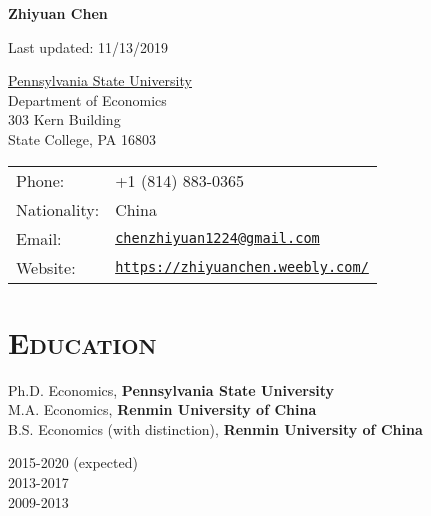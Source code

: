 \documentclass[letterpaper]{article}
\def\name{Zhiyuan Chen}
\begin{document}

\centerline{\huge \bf \name}

\vspace{1ex}

\normalsize


\begin{center}
{\scriptsize Last updated: 11/13/2019}
\end{center}

\vspace{0.25in}

\begin{minipage}{0.5\linewidth}
  \href{http://www.econ.psu.edu/}{Pennsylvania State University} \\
  Department of Economics \\
  303 Kern Building \\
  State College, PA 16803
\end{minipage}
\begin{minipage}{0.5\linewidth}
  \begin{tabular}{ll}
    Phone: & +1 (814) 883-0365 \\
    Nationality: &  China \\
    Email: & \href{mailto:chenzhiyuan1224@gmail.com}{\tt chenzhiyuan1224@gmail.com} \\
    Website: & \href{https://zhiyuanchen.weebly.com/}{\tt https://zhiyuanchen.weebly.com/} \\
  \end{tabular}
\end{minipage}




\section*{\textsc{Education}}
\begin{minipage}{0.7\textwidth}
 Ph.D. Economics, \textbf{Pennsylvania State University}\\
  M.A.  Economics, \textbf{Renmin University of China}  \\
 B.S.  Economics (with distinction), \textbf{Renmin University of China}
\end{minipage}
\begin{minipage}{0.3\textwidth}
   2015-2020 (expected)  \\
   2013-2017   \\
    2009-2013
\end{minipage}
\end{document}

